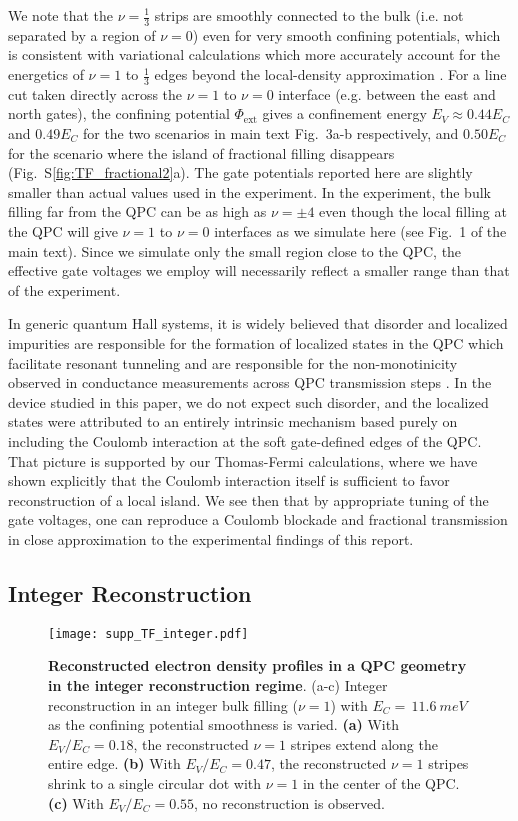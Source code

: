 \documentclass[reprint,prl,aps,superscriptaddress]{revtex4-1}
\begin{document}
We note that the $\nu=\tfrac13$ strips are smoothly connected to the bulk (i.e. not separated by a region of $\nu=0$) even for very smooth confining potentials, which is consistent with variational calculations which more accurately account for the energetics of $\nu=1$ to $\tfrac13$ edges beyond the local-density approximation \cite{khanna_fractional_2021}. 
For a line cut taken directly across the $\nu=1$ to $\nu=0$ interface (e.g. between the east and north gates), the confining potential $\Phi_\textrm{ext}$ gives a confinement energy $E_V \approx 0.44 E_C$ and $0.49 E_C$ for the two scenarios in main text Fig.~3a-b respectively, and $0.50 E_C$ for the scenario where the island of fractional filling disappears (Fig.~S\ref{fig:TF_fractional2}a).
The gate potentials reported here are slightly smaller than actual values used in the experiment. 
In the experiment, the bulk filling far from the QPC can be as high as $\nu=\pm 4$ even though the local filling at the QPC will give $\nu=1$ to $\nu=0$ interfaces as we simulate here (see Fig.~1 of the main text).
Since we simulate only the small region close to the QPC, the effective gate voltages we employ will necessarily reflect a smaller range than that of the experiment.

In generic quantum Hall systems, it is widely believed that disorder and localized impurities are responsible for the formation of localized states in the QPC which facilitate resonant tunneling and are responsible for the non-monotinicity observed in conductance measurements across QPC transmission steps \cite{Milliken1996,Ando1998,Baer2014}. 
In the device studied in this paper, we do not expect such disorder, and the localized states were attributed to an entirely intrinsic mechanism based purely on including the Coulomb interaction at the soft gate-defined edges of the QPC.  That picture is supported by our Thomas-Fermi calculations, where we have shown explicitly that the Coulomb interaction itself is sufficient to favor reconstruction of a local island.  We see then that by appropriate tuning of the gate voltages, one can reproduce a Coulomb blockade and fractional transmission in close approximation to the experimental findings of this report.

\subsection{Integer Reconstruction}
\begin{figure*}[ht!]
    \centering
    \texttt{[image: supp\_TF\_integer.pdf]}
    \caption{
    \textbf{Reconstructed electron density profiles in a QPC geometry in the integer reconstruction regime}. 
    (a-c) Integer reconstruction in an integer bulk filling ($\nu=1$) with $E_C = \,11.6~\si{meV}$ as the confining potential smoothness is varied.
    \textbf{(a)} With $E_V / E_C = 0.18$, the reconstructed $\nu=1$ stripes extend along the entire edge.
    \textbf{(b)} With $E_V/E_C = 0.47$, the reconstructed $\nu=1$ stripes shrink to a single circular dot with $\nu=1$ in the center of the QPC.
    \textbf{(c)} With $E_V/E_C = 0.55$, no reconstruction is observed.
    }
    \label{fig:TF_Integer}
\end{figure*}
\end{document}

